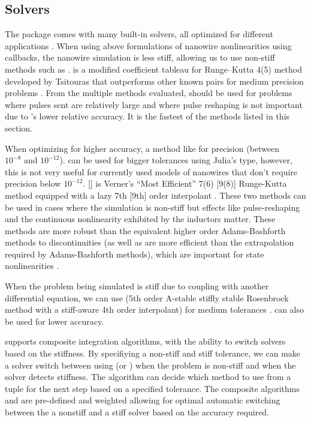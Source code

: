 \subsection{Solvers}

The  package comes with many built-in solvers, all optimized for different
applications \cite{ODESolver-diffeq}. When using above formulations of nanowire nonlinearities using
callbacks, the nanowire simulation is less stiff, allowing us to use non-stiff methods such as .
 is a modified coefficient tableau for Runge–Kutta 4(5) method developed by Tsitouras
that outperforms other known pairs for medium precision problems \cite{tsit5}. From the multiple methods 
evaluated,  should be used for problems where pulses sent are relatively large and where pulse
reshaping is not important due to 's lower relative accuracy. It is the fastest of the methods
listed in this section.

When optimizing for higher accuracy, a method like  for  precision (between $10^{-8}\text{ and }10^{-12}$).  can be used for bigger tolerances using Julia's 
 type, however, this is not very useful for currently used models of nanowires that
don't require precision below $10^{-12}$.  [] is Verner's ``Most Efficient'' 7(6) [9(8)] Runge-Kutta 
method equipped with a lazy 7th [9th] order interpolant \cite{vern}. These two methods can be used in
cases where the simulation is non-stiff but effects like pulse-reshaping and the continuous nonlinearity
exhibited by the inductors matter. These methods are more robust than the equivalent higher order 
Adams-Bashforth methods to discontinuities (as well as are more efficient than the extrapolation
required by Adams-Bashforth methods), which are important for state nonlinearities \cite{ODESolver-diffeq}.

When the problem being simulated is stiff due to coupling with another differential equation, we can
use  (5th order A-stable stiffly stable Rosenbrock method with a stiff-aware 4th order interpolant)
for medium tolerances \cite{ODESolver-diffeq}.  can also be used for lower accuracy.

 supports composite integration algorithms, with the ability to switch
solvers based on the stiffness. By specifiying a non-stiff and stiff tolerance, we can make a solver switch
between using  (or ) when the problem is non-stiff and  when the
solver detects stiffness. The  algorithm can decide which method to use from a tuple 
for the next step based on a specified tolerance. The composite algorithms  and  
are pre-defined and weighted allowing for optimal automatic switching between the a nonstiff and a stiff solver
based on the accuracy required.

